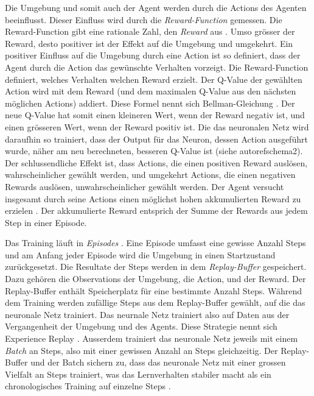 Die Umgebung und somit auch der Agent werden durch die Actions des Agenten
beeinflusst. Dieser Einfluss wird durch die \emph{Reward-Function} gemessen. Die
Reward-Function gibt eine rationale Zahl, den \emph{Reward} aus \cite[S.
75]{sutton_reinforcement_2014}. Umso grösser der Reward, desto positiver ist der
Effekt auf die Umgebung und umgekehrt. Ein positiver Einfluss auf die Umgebung
durch eine Action ist so definiert, dass der Agent durch die Action das
gewünschte Verhalten vorzeigt. Die Reward-Function definiert, welches Verhalten
welchen Reward erzielt. Der Q-Value der gewählten Action wird mit dem Reward
(und dem maximalen Q-Value aus den nächsten möglichen Actions) addiert. Diese
Formel nennt sich Bellman-Gleichung \cite[S. 3]{mnih_playing_nodate}. Der neue
Q-Value hat somit einen kleineren Wert, wenn der Reward negativ ist, und einen
grösseren Wert, wenn der Reward positiv ist. Die das neuronalen Netz wird
daraufhin so trainiert, dass der Output für das Neuron, dessen Action ausgeführt
wurde, näher am neu berechneten, besseren Q-Value ist (siehe autoref{schema2}).
Der schlussendliche Effekt ist, dass Actions, die einen positiven Reward
auslösen, wahrscheinlicher gewählt werden, und umgekehrt Actions, die einen
negativen Rewards auslösen, unwahrscheinlicher gewählt werden. Der Agent
versucht insgesamt durch seine Actions einen möglichst hohen akkumulierten
Reward zu erzielen \cite[S. 57]{sutton_reinforcement_2014}. Der akkumulierte
Reward entsprich der Summe der Rewards aus jedem Step in einer Episode.


Das Training läuft in \emph{Episodes} \cite[S. 14]{sutton_reinforcement_2014}. Eine Episode umfasst
eine gewisse Anzahl Steps und am Anfang jeder Episode wird die Umgebung in einen
Startzustand zurückgesetzt. Die Resultate der Steps werden in dem
\emph{Replay-Buffer} gespeichert. Dazu gehören die Observations der Umgebung, die
Action, und der Reward. Der Replay-Buffer enthält Speicherplatz für eine
bestimmte Anzahl Steps. Während dem Training werden zufällige Steps aus dem
Replay-Buffer gewählt, auf die das neuronale Netz trainiert. Das neurnale Netz
trainiert also auf Daten aus der Vergangenheit der Umgebung und des Agents.
Diese Strategie nennt sich Experience Replay \cite[S. 5]{mnih_playing_nodate}. Ausserdem trainiert
das neuronale Netz jeweils mit einem \emph{Batch} an Steps, also mit einer
gewissen Anzahl an Steps gleichzeitig. Der Replay-Buffer und der Batch sichern
zu, dass das neuronale Netz mit einer grossen Vielfalt an Steps trainiert, was
das Lernverhalten stabiler macht als ein chronologisches Training auf einzelne
Steps \cite{phd_how_2021}.


